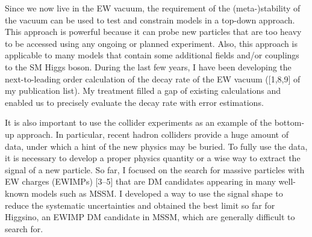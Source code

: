 \documentclass[12pt,notitlepage]{article}
\begin{document}
Since we now live in the EW vacuum, the requirement of the (meta-)stability of the vacuum can be used to test and constrain models in a top-down approach.
This approach is powerful because it can probe new particles that are too heavy to be accessed using any ongoing or planned experiment.
Also, this approach is applicable to many models that contain some additional fields and/or couplings to the SM Higgs boson.
During the last few years, I have been developing the next-to-leading order calculation of the decay rate of the EW vacuum ([1,8,9] of my publication list).
My treatment filled a gap of existing calculations and enabled us to precisely evaluate the decay rate with error estimations.

It is also important to use the collider experiments as an example of the bottom-up approach.
In particular, recent hadron colliders provide a huge amount of data, under which a hint of the new physics may be buried.
To fully use the data, it is necessary to develop a proper physics quantity or a wise way to extract the signal of a new particle.
So far, I focused on the search for massive particles with EW charges (EWIMPs) [3--5] that are DM candidates appearing in many well-known models such as MSSM.
I developed a way to use the signal shape to reduce the systematic uncertainties and obtained the best limit so far for Higgsino, an EWIMP DM candidate in MSSM, which are generally difficult to search for.
\end{document}
